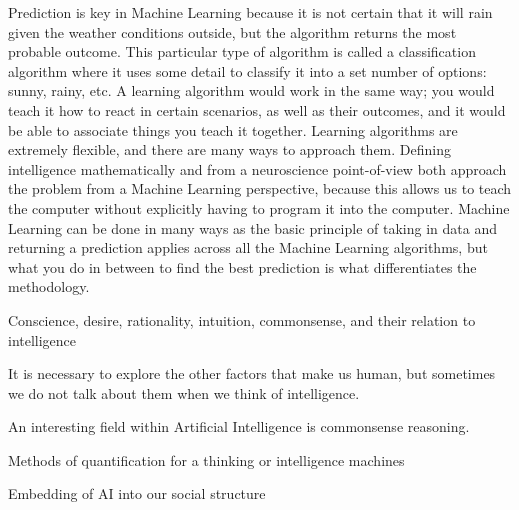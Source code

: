 \documentclass[11pt]{article}
\begin{document}
\par Prediction is key in Machine Learning because it is not certain that it will rain given the weather conditions outside, but the algorithm returns the most probable outcome. This particular type of algorithm is called a classification algorithm where it uses some detail to classify it into a set number of options: sunny, rainy, etc. A learning algorithm would work in the same way; you would teach it how to react in certain scenarios, as well as their outcomes, and it would be able to associate things you teach it together. Learning algorithms are extremely flexible, and there are many ways to approach them. Defining intelligence mathematically and from a neuroscience point-of-view both approach the problem from a Machine Learning perspective, because this allows us to teach the computer without explicitly having to program it into the computer. Machine Learning can be done in many ways as the basic principle of taking in data and returning a prediction applies across all the Machine Learning algorithms, but what you do in between to find the best prediction is what differentiates the methodology. 

\begin{center}
	{\large Conscience, desire, rationality, intuition, commonsense, and their relation to intelligence\par}
\end{center}

\par It is necessary to explore the other factors that make us human, but sometimes we do not talk about them when we think of intelligence. 

\par An interesting field within Artificial Intelligence is commonsense reasoning. 

\begin{center}
	{\large Methods of quantification for a thinking or intelligence machines\par}
\end{center}

\begin{center}
	{\large Embedding of AI into our social structure\par}
\end{center}
\end{document}
